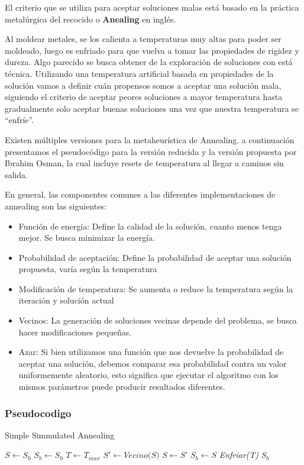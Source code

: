 El criterio que se utiliza para aceptar soluciones malas está basado en la práctica metalúrgica del recocido o \textbf{Anealing} en inglés.


Al moldear metales, se los calienta a temperaturas muy altas para poder ser moldeado, luego es enfriado para que vuelva a tomar las propiedades de rigidez y dureza. Algo parecido se busca obtener de la exploración de soluciones con está técnica.
Utilizando una temperatura artificial basada en propiedades de la solución vamos a definir cuán propensos somos a aceptar una solución mala, siguiendo el criterio de aceptar peores soluciones a mayor temperatura hasta gradualmente solo aceptar buenas soluciones una vez que nuestra temperatura se “enfríe”.


Existen múltiples versiones para la metaheurística de Annealing. a continuación presentamos el pseudocódigo para la versión reducida y la versión propuesta por Ibrahim Osman, la cual incluye resets de temperatura al llegar a caminos sin salida.

En general, las componentes comunes a las diferentes implementaciones de annealing son las siguientes:

\begin{itemize}
\item Función de energía: Define la calidad de la solución, cuanto menos tenga mejor. Se busca minimizar la energía.
\item Probabilidad de aceptación: Define la probabilidad de aceptar una solución propuesta, varía según la temperatura
\item Modificación de temperatura: Se aumenta o reduce la temperatura según la iteración y solución actual
\item Vecinos: La generación de soluciones vecinas depende del problema, se busca hacer modificaciones pequeñas.
\item Azar: Si bien utilizamos una función que nos devuelve la probabilidad de aceptar una solución, debemos comparar esa probabilidad contra un valor uniformemente aleatorio, esto significa que ejecutar el algoritmo con los mismos parámetros puede producir resultados diferentes.
\end{itemize}

\subsubsection{Pseudocodigo}

\begin{algorithm}[H]
\caption{Simple Simmulated Annealing}
\begin{algorithmic}[1]
\State $S \gets S_0$ 
\State $S_b \gets S_0$
\State $T \gets T_{max}$ 
\State
{} 
	\State $S' \gets \textit{Vecino(S)}$
		\State $S \gets S'$ 
	\EndIf	
	\State
		\State $S_b \gets S$ 
	\EndIf	
	\State \textit{Enfriar(T)} 
\EndWhile
\State
\State \Return $S_b$ 
\EndFunction
\end{algorithmic}
\end{algorithm}
\label{code:simple-annealing}

